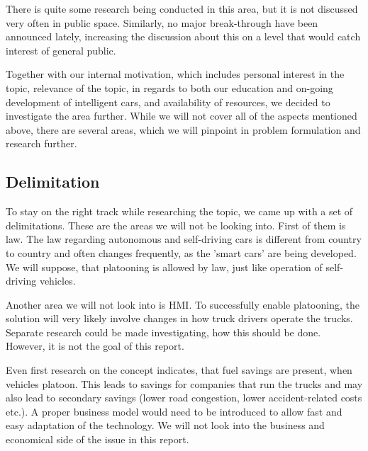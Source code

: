 % 
There is quite some research being conducted in this area, but it is not discussed very often in public space. Similarly, no major break-through have been announced lately, increasing the discussion about this on a level that would catch interest of general public.\par
% 
Together with our internal motivation, which includes personal interest in the topic, relevance of the topic, in regards to both our education and on-going development of intelligent cars, and availability of resources, we decided to investigate the area further. While we will not cover all of the aspects mentioned above, there are several areas, which we will pinpoint in problem formulation and research further.\par
%

% 
\subsection{Delimitation}
To stay on the right track while researching the topic, we came up with a set of delimitations. These are the areas we will not be looking into. First of them is law. The law regarding autonomous and self-driving cars is different from country to country and often changes frequently, as the 'smart cars' are being developed. We will suppose, that platooning is allowed by law, just like operation of self-driving vehicles.\par
Another area we will not look into is \acrfull{HMI}. To successfully enable platooning, the solution will very likely involve changes in how truck drivers operate the trucks. Separate research could be made investigating, how this should be done. However, it is not the goal of this report.\par
Even first research on the concept indicates, that fuel savings are present, when vehicles platoon. This leads to savings for companies that run the trucks and may also lead to secondary savings (lower road congestion, lower accident-related costs etc.). A proper business model would need to be introduced to allow fast and easy adaptation of the technology. We will not look into the business and economical side of the issue in this report.
% 
